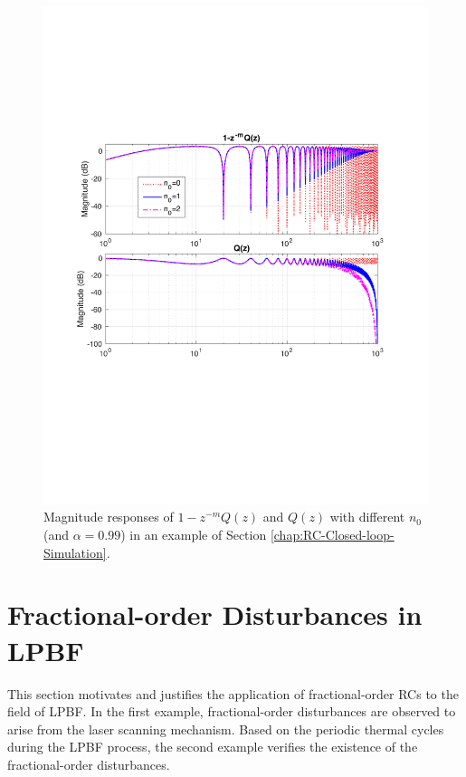 \documentclass [11pt, proquest] {uwthesis}[2020/02/24]
\begin{document}
\begin{figure}[!ht]
\begin{centering}
\includegraphics[clip,width=12cm]{Closed-loop-simulation/n0_threevalues_99}
\par\end{centering}
\centering{}\caption{\label{fig:Magnitude-responses-of-2}Magnitude responses of $1-z^{-m}Q(z)$
and $Q(z)$ with different $n_{0}$ (and $\alpha=0.99$) in an example
of Section \ref{chap:RC-Closed-loop-Simulation}.}
\end{figure}

\section{Fractional-order Disturbances in LPBF} \label{sec:Fractional-order-Disturbances}

This section motivates and justifies the application of fractional-order
RCs to the field of LPBF. In the first
example, fractional-order disturbances are observed to arise from
the laser scanning mechanism. Based on the periodic thermal cycles during the LPBF process, the second example verifies the existence of the fractional-order disturbances. 
\end{document}
